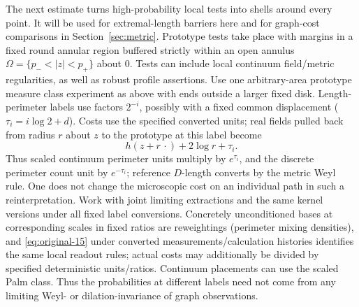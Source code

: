 The next estimate turns high-probability local tests into shells around
every point. It will be used for extremal-length barriers here and for
graph-cost comparisons in Section~\ref{sec:metric}.
Prototype tests take place with margins in a fixed round annular region buffered strictly within an
open annulus \(\Omega=\{p_-<|z|<p_+\}\) about 0. Tests can include local continuum field/metric
regularities, as well as robust profile assertions. Use one arbitrary-area prototype measure class
experiment as above with ends outside a larger fixed disk. Length-perimeter labels use factors
\(2^{-i}\), possibly with a fixed common displacement (\(\tau _i=i\log 2+d\)). Costs use the specified converted units; real fields pulled back
from radius \(r\) about \(z\) to the prototype at this label become
\[
         h(z+r\,\cdot )+2\log r+\tau _i .
\]
Thus scaled continuum perimeter units multiply by \(e^{\tau _i}\), and the discrete perimeter count
unit by \(e^{-\tau _i}\); reference \(D\)-length converts by the metric Weyl rule. One does not
change the microscopic cost on an individual path in such a reinterpretation. Work with joint
limiting extractions and the same kernel versions under all fixed label conversions. Concretely
unconditioned bases at corresponding scales in fixed ratios are reweightings (perimeter mixing
densities), and \eqref{eq:original-15} under converted measurements/calculation histories identifies
the same local readout rules; actual costs may additionally be divided by specified deterministic
units/ratios. Continuum placements can use the scaled Palm class. Thus the probabilities at
different labels need not come from any limiting Weyl- or dilation-invariance of graph observations.

